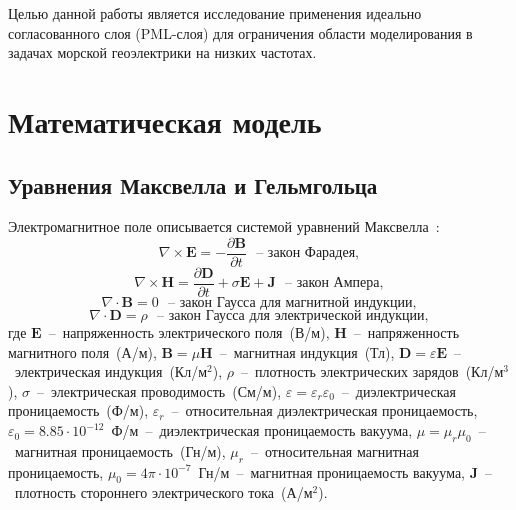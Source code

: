 \documentclass[a4paper,14pt]{article}
\begin{document}
Целью данной работы является исследование применения идеально согласованного слоя (PML-слоя) для ограничения области моделирования в задачах морской геоэлектрики на низких частотах.

\clearpage
\section{Математическая модель}
\subsection{Уравнения Максвелла и Гельмгольца}
Электромагнитное поле описывается системой уравнений Максвелла~\citep{epov}:
\begin{equation}
	\nabla \times \mathbf{E} = - \frac{ \partial \mathbf{B} }{ \partial t } \text{~~--~закон Фарадея}, \label{eq:maxwell:faradey}
\end{equation}
\begin{equation}
	\nabla \times \mathbf{H} = \frac{ \partial \mathbf{D} }{ \partial t } + \sigma \mathbf{E} + \mathbf{J} \text{~~--~закон Ампера}, \label{eq:maxwell:amper}
\end{equation}
\begin{equation*}
	\nabla \cdot \mathbf{B} = 0 \text{~~--~закон Гаусса для магнитной индукции}, \label{eq:maxwell:gauss_magn}
\end{equation*}
\begin{equation*}
	\nabla \cdot \mathbf{D} = \rho \text{~~--~закон Гаусса для электрической индукции}, \label{eq:maxwell:gauss_elect}
\end{equation*}
где $\mathbf{E}$~--~напряженность электрического поля~(В/м), $\mathbf{H}$~--~напряженность магнитного поля~(А/м), $\mathbf{B}=\mu \mathbf{H}$~--~магнитная индукция~(Тл), $\mathbf{D}=\varepsilon \mathbf{E}$~--~электрическая индукция~(Кл/м${}^2$), $\rho$~--~плотность электрических зарядов~(Кл/м${}^3$), $\sigma$~--~электрическая проводимость~(См/м), $\varepsilon = \varepsilon_r \varepsilon_0$~--~диэлектрическая проницаемость~(Ф/м), $\varepsilon_r$~--~относительная диэлектрическая проницаемость, $\varepsilon_0 = 8.85 \cdot 10^{-12}$~Ф/м~--~диэлектрическая проницаемость вакуума, $\mu = \mu_r \mu_0$~--~магнитная проницаемость~(Гн/м), $\mu_r$~--~относительная магнитная проницаемость, $\mu_0 = 4 \pi \cdot 10^{-7}$~Гн/м~--~магнитная проницаемость вакуума, $\mathbf{J}$~--~плотность стороннего электрического тока~(А/м${}^2$).
\end{document}
